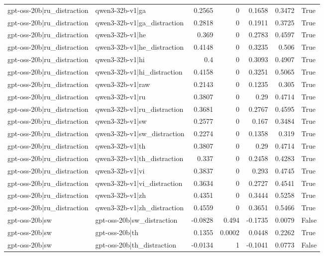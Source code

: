\begin{table}
\begin{tabular}{l l r r r r l}
gpt-oss-20b|ru_distraction & qwen3-32b-v1|ga & 0.2565 & 0 & 0.1658 & 0.3472 & True \\
gpt-oss-20b|ru_distraction & qwen3-32b-v1|ga_distraction & 0.2818 & 0 & 0.1911 & 0.3725 & True \\
gpt-oss-20b|ru_distraction & qwen3-32b-v1|he & 0.369 & 0 & 0.2783 & 0.4597 & True \\
gpt-oss-20b|ru_distraction & qwen3-32b-v1|he_distraction & 0.4148 & 0 & 0.3235 & 0.506 & True \\
gpt-oss-20b|ru_distraction & qwen3-32b-v1|hi & 0.4 & 0 & 0.3093 & 0.4907 & True \\
gpt-oss-20b|ru_distraction & qwen3-32b-v1|hi_distraction & 0.4158 & 0 & 0.3251 & 0.5065 & True \\
gpt-oss-20b|ru_distraction & qwen3-32b-v1|raw & 0.2143 & 0 & 0.1235 & 0.305 & True \\
gpt-oss-20b|ru_distraction & qwen3-32b-v1|ru & 0.3807 & 0 & 0.29 & 0.4714 & True \\
gpt-oss-20b|ru_distraction & qwen3-32b-v1|ru_distraction & 0.3681 & 0 & 0.2767 & 0.4595 & True \\
gpt-oss-20b|ru_distraction & qwen3-32b-v1|sw & 0.2577 & 0 & 0.167 & 0.3484 & True \\
gpt-oss-20b|ru_distraction & qwen3-32b-v1|sw_distraction & 0.2274 & 0 & 0.1358 & 0.319 & True \\
gpt-oss-20b|ru_distraction & qwen3-32b-v1|th & 0.3807 & 0 & 0.29 & 0.4714 & True \\
gpt-oss-20b|ru_distraction & qwen3-32b-v1|th_distraction & 0.337 & 0 & 0.2458 & 0.4283 & True \\
gpt-oss-20b|ru_distraction & qwen3-32b-v1|vi & 0.3837 & 0 & 0.293 & 0.4745 & True \\
gpt-oss-20b|ru_distraction & qwen3-32b-v1|vi_distraction & 0.3634 & 0 & 0.2727 & 0.4541 & True \\
gpt-oss-20b|ru_distraction & qwen3-32b-v1|zh & 0.4351 & 0 & 0.3444 & 0.5258 & True \\
gpt-oss-20b|ru_distraction & qwen3-32b-v1|zh_distraction & 0.4559 & 0 & 0.3651 & 0.5466 & True \\
gpt-oss-20b|sw & gpt-oss-20b|sw_distraction & -0.0828 & 0.494 & -0.1735 & 0.0079 & False \\
gpt-oss-20b|sw & gpt-oss-20b|th & 0.1355 & 0.0002 & 0.0448 & 0.2262 & True \\
gpt-oss-20b|sw & gpt-oss-20b|th_distraction & -0.0134 & 1 & -0.1041 & 0.0773 & False \\

\end{tabular}
\end{table}
